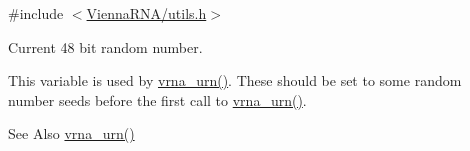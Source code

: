 {\ttfamily \#include $<$\hyperlink{utils_8h}{Vienna\-R\-N\-A/utils.\-h}$>$}



Current 48 bit random number. 

This variable is used by \hyperlink{group__utils_ga384e256ebb295d04a14426179db0dd6e}{vrna\-\_\-urn()}. These should be set to some random number seeds before the first call to \hyperlink{group__utils_ga384e256ebb295d04a14426179db0dd6e}{vrna\-\_\-urn()}.

\begin{DoxySeeAlso}{See Also}
\hyperlink{group__utils_ga384e256ebb295d04a14426179db0dd6e}{vrna\-\_\-urn()} 
\end{DoxySeeAlso}
